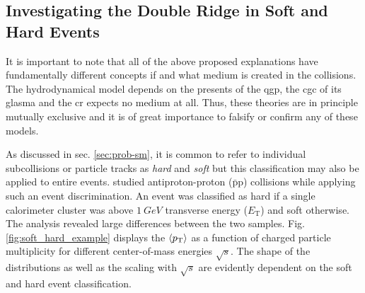 \subsection{Investigating the Double Ridge in Soft and Hard Events}
\label{sec:hard-soft}

It is important to note that all of the above proposed explanations have fundamentally different concepts if and what medium is created in the collisions. The hydrodynamical model depends on the presents of the \gls{qgp}, the \gls{cgc} of its glasma and the \gls{cr} expects no medium at all. Thus, these theories are in principle mutually exclusive and it is of great importance to falsify or confirm any of these models. 

As discussed in sec. \ref{sec:prob-sm}, it is common to refer to individual subcollisions or particle tracks as \emph{hard} and \emph{soft} but this classification may also be applied to entire events. \cite{Acosta2002} studied antiproton-proton ($\bar{\text{p}}\text{p}$) collisions while applying such an event discrimination. An event was classified as hard if a single calorimeter cluster was above $\SI{1}{GeV}$ transverse energy ($E_{\text{T}}$) and soft otherwise. The analysis revealed large differences between the two samples. Fig. \ref{fig:soft_hard_example} displays the $\left< p_{\text{T}} \right>$ as a function of charged particle multiplicity for different center-of-mass energies $\sqrt{s}$. The shape of the distributions as well as the scaling with $\sqrt{s}$ are evidently dependent on the soft and hard event classification.
